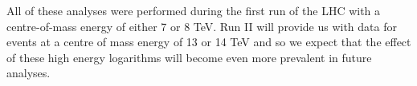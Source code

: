 All of these analyses were performed during the first run of the LHC with a centre-of-mass energy of either 7 or 8 TeV. Run II will provide us with data for events at a centre of mass energy of 13 or 14 TeV and so we expect that the effect of these high energy logarithms will become even more prevalent in future analyses. 
